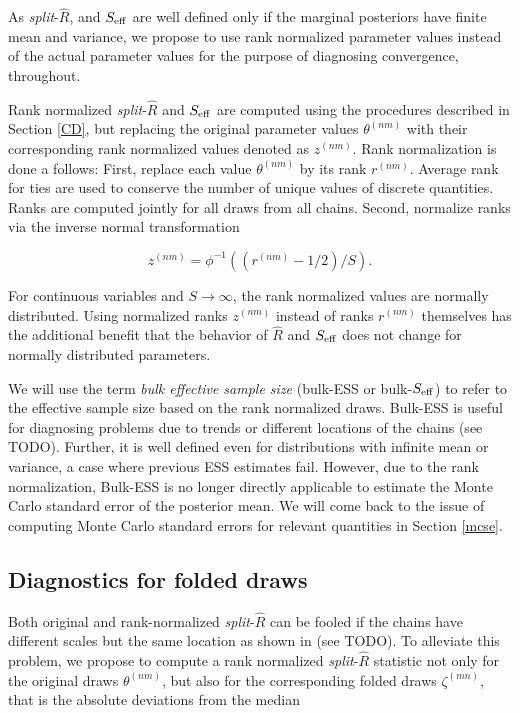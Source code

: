 \documentclass[american,]{article}
\begin{document}
As \emph{split}-\(\widehat{R}\), and \(S_{\rm eff}\) are well defined
only if the marginal posteriors have finite mean and variance, we
propose to use rank normalized parameter values instead of the actual
parameter values for the purpose of diagnosing convergence, throughout.

Rank normalized \emph{split}-\(\widehat{R}\) and \(S_{\rm eff}\) are
computed using the procedures described in Section \ref{CD}, but
replacing the original parameter values \(\theta^{(nm)}\) with their
corresponding rank normalized values denoted as \(z^{(nm)}\). Rank
normalization is done a follows: First, replace each value
\(\theta^{(nm)}\) by its rank \(r^{(nm)}\). Average rank for ties are
used to conserve the number of unique values of discrete quantities.
Ranks are computed jointly for all draws from all chains. Second,
normalize ranks via the inverse normal transformation

\begin{equation}
z^{(nm)} = \phi^{-1}((r^{(nm)}-1/2)/S).
\end{equation}

For continuous variables and \(S \rightarrow \infty\), the rank
normalized values are normally distributed. Using normalized ranks
\(z^{(nm)}\) instead of ranks \(r^{(nm)}\) themselves has the additional
benefit that the behavior of \(\widehat{R}\) and \(S_{\rm eff}\) does
not change for normally distributed parameters.

We will use the term \emph{bulk effective sample size} (bulk-ESS or
bulk-\(S_{\rm eff}\)) to refer to the effective sample size based on the
rank normalized draws. Bulk-ESS is useful for diagnosing problems due to
trends or different locations of the chains (see TODO). Further, it is
well defined even for distributions with infinite mean or variance, a
case where previous ESS estimates fail. However, due to the rank
normalization, Bulk-ESS is no longer directly applicable to estimate the
Monte Carlo standard error of the posterior mean. We will come back to
the issue of computing Monte Carlo standard errors for relevant
quantities in Section \ref{mcse}.

\hypertarget{diagnostics-for-folded-draws}{%
\subsection{Diagnostics for folded
draws}\label{diagnostics-for-folded-draws}}

Both original and rank-normalized \emph{split}-\(\widehat{R}\) can be
fooled if the chains have different scales but the same location as
shown in (see TODO). To alleviate this problem, we propose to compute a
rank normalized \emph{split}-\(\widehat{R}\) statistic not only for the
original draws \(\theta^{(nm)}\), but also for the corresponding folded
draws \(\zeta^{(mn)}\), that is the absolute deviations from the median
\end{document}
